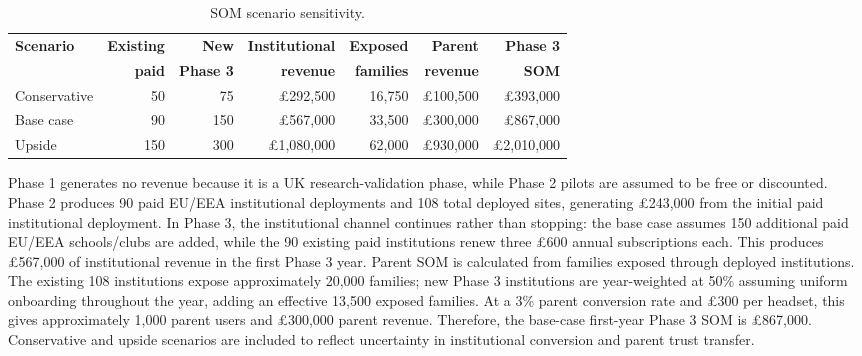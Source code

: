 \begin{table}[htbp]
    \centering
    \footnotesize
    \caption{SOM scenario sensitivity.}
    \label{tab:ent-som-scenarios}
    \begin{tabular}{lrrrrrr}
        \toprule
        \textbf{Scenario} & \textbf{Existing} & \textbf{New} & \textbf{Institutional} & \textbf{Exposed} & \textbf{Parent} & \textbf{Phase 3} \\
        & \textbf{paid} & \textbf{Phase 3} & \textbf{revenue} & \textbf{families} & \textbf{revenue} & \textbf{SOM} \\
        \midrule
        Conservative & 50 & 75  & \pounds{}292,500  & 16,750 & \pounds{}100,500 & \pounds{}393,000 \\
        Base case    & 90 & 150 & \pounds{}567,000 & 33,500 & \pounds{}300,000 & \pounds{}867,000 \\
        Upside       & 150 & 300 & \pounds{}1,080,000 & 62,000 & \pounds{}930,000 & \pounds{}2,010,000 \\
        \bottomrule
    \end{tabular}
\end{table}

Phase 1 generates no revenue because it is a UK research-validation phase, while Phase 2 pilots are assumed to be free or discounted. Phase 2 produces 90 paid EU/EEA institutional deployments and 108 total deployed sites, generating \pounds{}243,000 from the initial paid institutional deployment. In Phase 3, the institutional channel continues rather than stopping: the base case assumes 150 additional paid EU/EEA schools/clubs are added, while the 90 existing paid institutions renew three \pounds{}600 annual subscriptions each. This produces \pounds{}567,000 of institutional revenue in the first Phase 3 year. Parent SOM is calculated from families exposed through deployed institutions. The existing 108 institutions expose approximately 20,000 families; new Phase 3 institutions are year-weighted at 50\% assuming uniform onboarding throughout the year, adding an effective 13,500 exposed families. At a 3\% parent conversion rate and \pounds{}300 per headset, this gives approximately 1,000 parent users and \pounds{}300,000 parent revenue. Therefore, the base-case first-year Phase 3 SOM is \pounds{}867,000. Conservative and upside scenarios are included to reflect uncertainty in institutional conversion and parent trust transfer.

